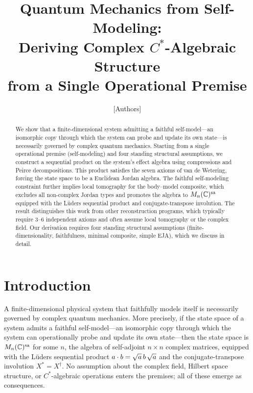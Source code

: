 \documentclass[11pt]{article}
\title{Quantum Mechanics from Self-Modeling:\\
Deriving Complex $C^*$-Algebraic Structure\\from a Single Operational Premise}
\author{[Authors]}
\date{}
\begin{document}
\maketitle

\begin{abstract}
We show that a finite-dimensional system admitting a faithful
self-model---an isomorphic copy through which the system can probe and
update its own state---is necessarily governed by complex quantum
mechanics.  Starting from a single operational premise (self-modeling)
and four standing structural assumptions, we construct a sequential
product on the system's effect algebra using compressions and Peirce
decompositions.  This product satisfies the seven axioms of van de
Wetering, forcing the state space to be a Euclidean Jordan algebra.
The faithful self-modeling constraint further implies local tomography
for the body--model composite, which excludes all non-complex Jordan
types and promotes the algebra to $\Mnsa{n}$ equipped with the
L\"uders sequential product and conjugate-transpose involution.  The
result distinguishes this work from other reconstruction programs,
which typically require 3--6 independent axioms and often assume local
tomography or the complex field.  Our derivation requires four standing
structural assumptions (finite-dimensionality, faithfulness, minimal
composite, simple EJA), which we discuss in detail.
\end{abstract}


\section{Introduction}
\label{sec:intro}

A finite-dimensional physical system that faithfully models itself is
necessarily governed by complex quantum mechanics.  More precisely, if
the state space of a system admits a faithful self-model---an
isomorphic copy through which the system can operationally probe and
update its own state---then the state space is $\Mnsa{n}$ for some
$n$, the algebra of self-adjoint $n \times n$ complex matrices,
equipped with the L\"uders sequential product
$\sp{a}{b} = \sqrt{a}\, b\, \sqrt{a}$ and the conjugate-transpose
involution $X^{*} = X^{\dagger}$.  No assumption about the complex
field, Hilbert space structure, or $C^{*}$-algebraic operations enters
the premises; all of these emerge as consequences.
\end{document}
